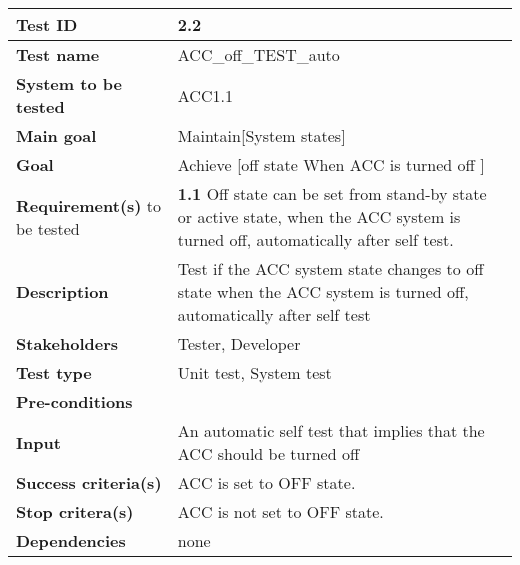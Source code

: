 	\begin{table}[H]
		\begin{tabular}{| p{4cm} | p{10cm} |}
			\hline
			\rowcolor{gray}
			{\bf Test ID} & 2.2 \\ \hline
			{\bf Test name} & ACC\_off\_TEST\_auto\\ \hline
			{\bf System to be tested} & ACC1.1\\ \hline
			{\bf Main goal} & Maintain[System states] \\ \hline
			{\bf Goal} & Achieve [off state When ACC is turned off ]\\ \hline
			{\bf Requirement(s)} to be tested & 
			{\bf 1.1} Off state can be set from stand-by state or active state, when the 
			ACC system is turned off, automatically after self test.\\ \hline
			{\bf Description} & Test if the ACC system state changes to off state when 
			the ACC system is turned off, automatically after self test \\ \hline
			{\bf Stakeholders} & Tester, Developer \\ \hline
			{\bf Test type} & Unit test, System test \\ \hline
			{\bf Pre-conditions} & \\ \hline
			{\bf Input} & An automatic self test that implies that the ACC should be turned 
			off \\ \hline
			{\bf Success criteria(s)} & ACC is set to OFF state.\\ \hline
			{\bf Stop critera(s)} & ACC is not set to OFF state. \\ \hline
			{\bf Dependencies} & none\\ \hline
		\end{tabular}
	\end{table}


